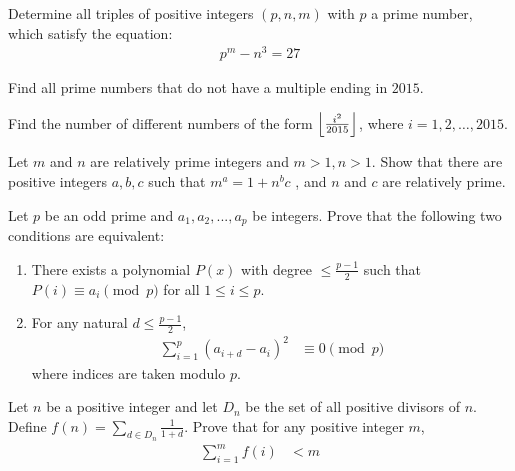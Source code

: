 \begin{problem}[Chile 2016]
	Determine all triples of positive integers $(p, n, m)$ with $p$ a prime number, which satisfy the equation:
	\begin{align*}
		p^m - n^3 = 27
	\end{align*}
\end{problem}

\begin{problem}
	Find all prime numbers that do not have a multiple ending in $2015$.
\end{problem}

\begin{problem}[Chile 2016]
	Find the number of different numbers of the form $\left\lfloor{\frac{i^2}{2015}}\right\rfloor$, where $i=1,2,\dots,2015$.
\end{problem}

\begin{problem}
	Let $m$ and $n$ are relatively prime integers and $m>1,n>1$. Show that there are positive integers $a,b,c$ such that $m^a=1+n^bc$ , and $n$ and $c$ are relatively prime. %
\end{problem}

\begin{problem}
	Let $p$ be an odd prime and $a_1, a_2,...,a_p$ be integers. Prove that the following two conditions are equivalent:
	\begin{enumerate}
		\item There exists a polynomial $P(x)$ with degree $\leq \frac{p-1}{2}$ such that $P(i) \equiv a_i \pmod p$ for all $1 \leq i \leq p$.
		\item For any natural $d \leq \frac{p-1}{2}$,
			\begin{align*}
				\sum_{i=1}^p (a_{i+d} - a_i )^2
					& \equiv 0 \pmod p
			\end{align*}
		where indices are taken modulo $p$.
	\end{enumerate}
\end{problem}

\begin{problem}
	Let $n$ be a positive integer and let $D_n$ be the set of all positive divisors of $n$. Define $f(n)=\sum\limits_{d\in D_n}{\frac{1}{1+d}}$.
	Prove that for any positive integer $m$,
		\begin{align*}
			\sum_{i=1}^{m}{f(i)}
				& <m
		\end{align*}
\end{problem}

